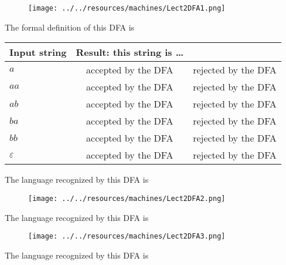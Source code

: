     
    
    
    \begin{figure}[h]
       \centering
       \texttt{[image: ../../resources/machines/Lect2DFA1.png]} 
    \end{figure}
    
    The formal definition of this DFA is
    
    \vspace{100pt}
    
    
    \begin{center}
    \begin{tabular}{lcc}
    {\bf Input string} & {\bf Result}: this string is \ldots    & \\
    \hline
    $a$ & accepted by the DFA & rejected by the DFA \\
    $aa$ & accepted by the DFA & rejected by the DFA \\
    $ab$ & accepted by the DFA & rejected by the DFA \\
    $ba$ & accepted by the DFA & rejected by the DFA \\
    $bb$ & accepted by the DFA & rejected by the DFA \\
    $\varepsilon$ & accepted by the DFA & rejected by the DFA \\
    \end{tabular}
    \end{center}
    
    The language recognized by this DFA is
    
    
    \begin{figure}[h]
       \centering
       \texttt{[image: ../../resources/machines/Lect2DFA2.png]} 
    \end{figure}
    
    
    
    The language recognized by this DFA is
    
    
    
    \begin{figure}[h]
       \centering
       \texttt{[image: ../../resources/machines/Lect2DFA3.png]} 
    \end{figure}
    
    
    The language recognized by this DFA is
    
    


